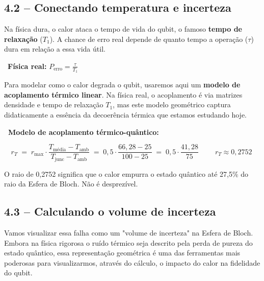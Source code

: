 \subsection{4.2 -- Conectando temperatura e incerteza}

\begin{fala}
Na física dura, o calor ataca o tempo de vida do qubit, o famoso \textbf{tempo de relaxação} ($T_1$). A chance de erro real depende de quanto tempo a operação ($\tau$) dura em relação a essa vida útil.
\end{fala}

\begin{tela}
\faDesktop\ \textbf{Física real:} $P_{\text{erro}} = \frac{\tau}{T_1}$
\end{tela}

\begin{fala}
Para modelar como o calor degrada o qubit, usaremos aqui um \textbf{modelo de acoplamento térmico linear}. Na física real, o acoplamento é via matrizes densidade e tempo de relaxação $T_1$, mas este modelo geométrico captura didaticamente a essência da decoerência térmica que estamos estudando hoje.
\end{fala}

\begin{mathblock}
\textbf{\color{corMath}\faSuperscript\ Modelo de acoplamento térmico-quântico:}

\[
  r_T
  \;=\;
  r_{\max}
  \cdot
  \frac{T_{\text{média}} - T_{\text{amb}}}{T_{\text{junc}} - T_{\text{amb}}}
  \;=\;
  0{,}5 \cdot \frac{66{,}28 - 25}{100 - 25}
  \;=\;
  0{,}5 \cdot \frac{41{,}28}{75}
  \qquad
  \boxed{\;r_T \approx 0{,}2752\;}
\]
\end{mathblock}

\begin{fala}
O raio de 0,2752 significa que o calor empurra o estado quântico até 27,5\%
do raio da Esfera de Bloch. Não é desprezível.
\end{fala}

\subsection{4.3 -- Calculando o volume de incerteza}

\begin{fala}
Vamos visualizar essa falha como um "volume de incerteza" na Esfera de Bloch. Embora na física rigorosa o ruído térmico seja descrito pela perda de pureza do estado quântico, essa representação geométrica é uma das ferramentas mais poderosas para visualizarmos, através do cálculo, o impacto do calor na fidelidade do qubit.
\end{fala}

